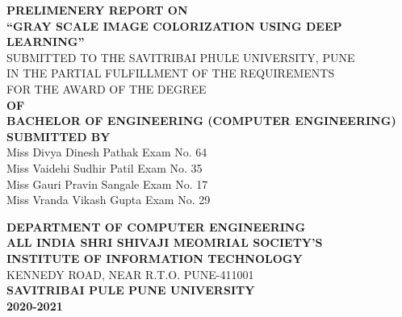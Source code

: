 \documentclass[12pt]{report}	%
\begin{document}

	\begin{titlepage}   
		\thisfancypage{\setlength{\fboxsep}{10pt}\doublebox}{}
		\vspace*{0.1in}
		\begin{center}
		{ \bf { PRELIMENERY REPORT ON}}\\
		\vspace{0.2in}
		{\Large \bf {``GRAY SCALE IMAGE COLORIZATION USING DEEP LEARNING''}}
		\\
		\vspace{0.2in}
		{\small  SUBMITTED TO THE SAVITRIBAI PHULE UNIVERSITY, PUNE \\ IN THE PARTIAL FULFILLMENT OF THE REQUIREMENTS \\ FOR THE AWARD OF THE DEGREE }\\
		{\bf OF}\\
		{\bf BACHELOR OF ENGINEERING (COMPUTER ENGINEERING)}\\
		\vspace{0.2in}
		{\bf SUBMITTED BY}\\
		\vspace{0.1in}
		{\small   Miss Divya Dinesh Pathak \hspace*{1.9 in} Exam No. 64 \\Miss Vaidehi Sudhir Patil \hspace*{1.9 in} Exam No. 35 \\Miss Gauri Pravin Sangale\hspace*{1.9 in} Exam No. 17 \\Miss Vranda Vikash Gupta\hspace*{1.9 in} Exam No. 29 }\\
		\vspace{0.1in}
		\begin{figure}[h]
		\centerline{}
		\label{atcres}
		\end{figure}
		{ \bf{ DEPARTMENT OF COMPUTER ENGINEERING}}\\ 
		\vspace{0.05in}
		{ \bf ALL INDIA SHRI SHIVAJI MEOMRIAL SOCIETY'S \\
		{\large \bf INSTITUTE OF INFORMATION TECHNOLOGY }}\\ 
		{\small KENNEDY ROAD, NEAR R.T.O. PUNE-411001 }\\ 
		\vspace{0.05in}	
		{ \bf { SAVITRIBAI PULE PUNE UNIVERSITY}}\\	
		{ \bf \small { 2020-2021}}\\
			\end{center}
	\end{titlepage}
	\thisfancypage{\setlength{\fboxsep}{10pt}\doublebox}{}	
	
\end{document}
